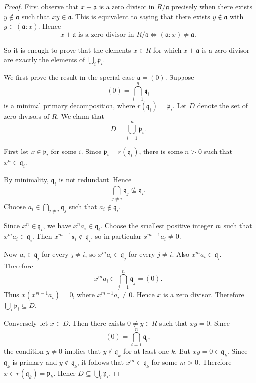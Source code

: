 \begin{proof}
First observe that \(x+\mathfrak a\) is a zero divisor in \(R/\mathfrak a\) precisely when there exists \(y\notin \mathfrak a\) such that \(xy\in \mathfrak a\). This is equivalent to saying that there exists \(y\notin \mathfrak a\) with \(y\in(\mathfrak a:x)\). Hence
\[
    x+\mathfrak a \text{ is a zero divisor in } R/\mathfrak a
    \iff
    (\mathfrak a:x)\neq \mathfrak a.
\]

So it is enough to prove that the elements \(x\in R\) for which \(x+\mathfrak a\) is a zero divisor are exactly the elements of \(\bigcup_i\mathfrak p_i\).

We first prove the result in the special case \(\mathfrak a=(0)\). Suppose
\[
    (0)=\bigcap_{i=1}^n \mathfrak q_i
\]
is a minimal primary decomposition, where \(r(\mathfrak q_i)=\mathfrak p_i\). Let \(D\) denote the set of zero divisors of \(R\). We claim that
\[
    D=\bigcup_{i=1}^n \mathfrak p_i.
\]

First let \(x\in \mathfrak p_i\) for some \(i\). Since \(\mathfrak p_i=r(\mathfrak q_i)\), there is some \(n > 0\) such that \(x^n\in \mathfrak q_i\).

By minimality, \(\mathfrak q_i\) is not redundant. Hence
\[
    \bigcap_{j\neq i}\mathfrak q_j \nsubseteq \mathfrak q_i.
\]
Choose \(a_i\in\bigcap_{j\neq i}\mathfrak q_j\) such that \(a_i\notin\mathfrak q_i\).

Since \(x^n\in\mathfrak q_i\), we have \(x^n a_i\in\mathfrak q_i\). Choose the smallest positive integer \(m\) such that \(x^m a_i\in\mathfrak q_i\). Then \(x^{m-1}a_i\notin\mathfrak q_i\), so in particular \(x^{m-1}a_i\neq 0\).

Now \(a_i\in\mathfrak q_j\) for every \(j\neq i\), so \(x^m a_i\in\mathfrak q_j\) for every \(j\neq i\). Also \(x^m a_i\in\mathfrak q_i\). Therefore
\[
    x^m a_i\in \bigcap_{j=1}^n \mathfrak q_j=(0).
\]
Thus \(x(x^{m-1}a_i)=0\), where \(x^{m-1}a_i\neq 0\). Hence \(x\) is a zero divisor. Therefore \(\bigcup_i\mathfrak p_i\subseteq D\).

Conversely, let \(x\in D\). Then there exists \(0\neq y\in R\) such that \(xy=0\). Since
\[
    (0)=\bigcap_{i=1}^n \mathfrak q_i,
\]
the condition \(y\neq 0\) implies that \(y\notin\mathfrak q_k\) for at least one \(k\). But \(xy=0\in\mathfrak q_k\). Since \(\mathfrak q_k\) is primary and \(y\notin\mathfrak q_k\), it follows that \(x^m\in\mathfrak q_k\) for some \(m > 0\). Therefore \(x\in r(\mathfrak q_k)=\mathfrak p_k\). Hence \(D\subseteq\bigcup_i\mathfrak p_i\).


\end{proof}
